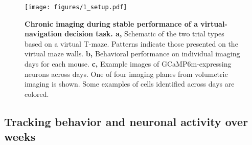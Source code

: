 \begin{figure}
\texttt{[image: figures/1\_setup.pdf]}
\caption[Chronic imaging during stable performance of a virtual-navigation decision task.]{\textbf{Chronic imaging during stable performance of a virtual-navigation decision task. a,} Schematic of the two trial types based on a virtual T-maze. Patterns indicate those presented on the virtual maze walls.
%
\textbf{b,} Behavioral performance on individual imaging days for each mouse. 
%
\textbf{c,} Example images of GCaMP6m-expressing neurons across days. One of four imaging planes from volumetric imaging is shown. Some examples of cells identified across days are colored. 
\label{fig:1_setup}}
\end{figure}

\subsection{Tracking behavior and neuronal activity over weeks} \label{sec:chap3_track_neuron_behavior}

